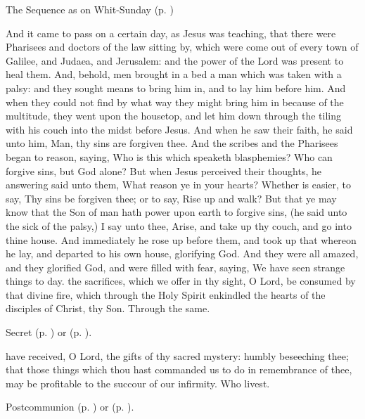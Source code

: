\begin{rubric}
{The Sequence as on Whit-Sunday (p. \pageref{WhitSeq})}
\end{rubric}

 And it came to pass on a certain day, as Jesus was teaching, that there were Pharisees and doctors of the law sitting by, which were come out of every town of Galilee, and Judaea, and Jerusalem: and the power of the Lord was present to heal them. And, behold, men brought in a bed a man which was taken with a palsy: and they sought means to bring him in, and to lay him before him. And when they could not find by what way they might bring him in because of the multitude, they went upon the housetop, and let him down through the tiling with his couch into the midst before Jesus. And when he saw their faith, he said unto him, Man, thy sins are forgiven thee. And the scribes and the Pharisees began to reason, saying, Who is this which speaketh blasphemies? Who can forgive sins, but God alone? But when Jesus perceived their thoughts, he answering said unto them, What reason ye in your hearts? Whether is easier, to say, Thy sins be forgiven thee; or to say, Rise up and walk? But that ye may know that the Son of man hath power upon earth to forgive sins, (he said unto the sick of the palsy,) I say unto thee, Arise, and take up thy couch, and go into thine house. And immediately he rose up before them, and took up that whereon he lay, and departed to his own house, glorifying God. And they were all amazed, and they glorified God, and were filled with fear, saying, We have seen strange things to day.
\secret
{} the sacrifices, which we offer in thy sight, O Lord, be consumed by that divine fire, which through the Holy Spirit enkindled the hearts of the disciples of Christ, thy Son. Through the same.
\begin{rubric}
     Secret  (p. \pageref{SPAgainst}) or  (p. \pageref{SPChiefBishop}).
\end{rubric}

\postcommunion
{} have received, O Lord, the gifts of thy sacred mystery: humbly beseeching thee; that those things which thou hast commanded us to do in remembrance of thee, may be profitable to the succour of our infirmity. Who livest.
\begin{rubric}
     Postcommunion  (p. \pageref{SPAgainst}) or  (p. \pageref{SPChiefBishop}).
\end{rubric}


